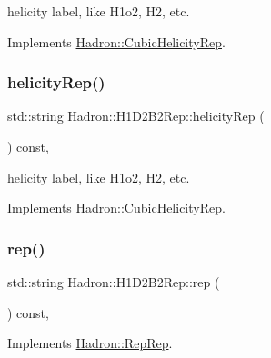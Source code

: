 helicity label, like H1o2, H2, etc. 

Implements \mbox{\hyperlink{structHadron_1_1CubicHelicityRep_af1096946b7470edf0a55451cc662f231}{Hadron\+::\+Cubic\+Helicity\+Rep}}.

\mbox{\label{structHadron_1_1H1D2B2Rep_a062fbbb46713530665aa762d773fa6f6}} 
\subsubsection{\texorpdfstring{helicityRep()}{helicityRep()}\hspace{0.1cm}{\footnotesize\ttfamily [2/2]}}
{\footnotesize\ttfamily std\+::string Hadron\+::\+H1\+D2\+B2\+Rep\+::helicity\+Rep (\begin{DoxyParamCaption}{ }\end{DoxyParamCaption}) const\hspace{0.3cm}{\ttfamily [inline]}, {\ttfamily [virtual]}}

helicity label, like H1o2, H2, etc. 

Implements \mbox{\hyperlink{structHadron_1_1CubicHelicityRep_af1096946b7470edf0a55451cc662f231}{Hadron\+::\+Cubic\+Helicity\+Rep}}.

\mbox{\label{structHadron_1_1H1D2B2Rep_a12878ffcfbf3732a19b7b27407e4b026}} 
\subsubsection{\texorpdfstring{rep()}{rep()}\hspace{0.1cm}{\footnotesize\ttfamily [1/3]}}
{\footnotesize\ttfamily std\+::string Hadron\+::\+H1\+D2\+B2\+Rep\+::rep (\begin{DoxyParamCaption}{ }\end{DoxyParamCaption}) const\hspace{0.3cm}{\ttfamily [inline]}, {\ttfamily [virtual]}}



Implements \mbox{\hyperlink{structHadron_1_1RepRep_ab3213025f6de249f7095892109575fde}{Hadron\+::\+Rep\+Rep}}.

\mbox{\label{structHadron_1_1H1D2B2Rep_a12878ffcfbf3732a19b7b27407e4b026}} 
